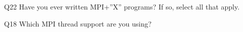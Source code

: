 \begin{description}%
\item{Q22} Have you ever written MPI+”X” programs? If so, select all that apply.%
\item{Q18} Which MPI thread support are you using?%
\end{description}%
